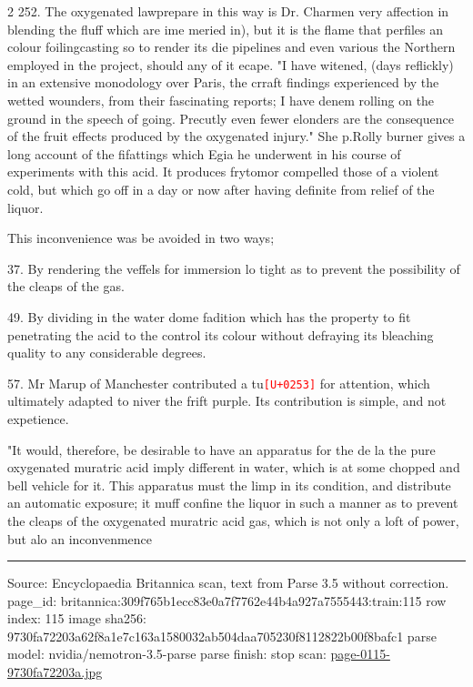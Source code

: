 \documentclass[10pt]{article}
\newcommand{\unk}[1]{\textcolor{red}{\texttt{\scriptsize[U+#1]}}}
\begin{document}
\begin{multicols}{2}
252. The oxygenated lawprepare in this way is Dr. Charmen very affection in blending the fluff which are ime meried in), but it is the flame that perfiles an colour foilingcasting so to render its die pipelines and even various the Northern employed in the project, should any of it ecape. "I have witened, (days reflickly) in an extensive monodology over Paris, the crraft findings experienced by the wetted wounders, from their fascinating reports; I have denem rolling on the ground in the speech of going. Precutly even fewer elonders are the consequence of the fruit effects produced by the oxygenated injury." She p.Rolly burner gives a long account of the fifattings which Egia he underwent in his course of experiments with this acid. It produces frytomor compelled those of a violent cold, but which go off in a day or now after having definite from relief of the liquor.

This inconvenience was be avoided in two ways;

37. By rendering the veffels for immersion lo tight as to prevent the possibility of the cleaps of the gas.

49. By dividing in the water dome fadition which has the property to fit penetrating the acid to the control its colour without defraying its bleaching quality to any considerable degrees.

57. Mr Marup of Manchester contributed a tu\unk{0253} for attention, which ultimately adapted to niver the frift purple. Its contribution is simple, and not expetience.

"It would, therefore, be desirable to have an apparatus for the de la the pure oxygenated muratric acid imply different in water, which is at some chopped and bell vehicle for it. This apparatus must the limp in its condition, and distribute an automatic exposure; it muff confine the liquor in such a manner as to prevent the cleaps of the oxygenated muratric acid gas, which is not only a loft of power, but alo an inconvenmence

\end{multicols}
\vfill\par\noindent\rule{\linewidth}{0.4pt}\par
{\scriptsize\color{gray}\noindent Source: Encyclopaedia Britannica scan, text from Parse 3.5 without correction. page\_id: britannica:309f765b1ecc83e0a7f7762e44b4a927a7555443:train:115 \quad row index: 115 \quad image sha256: 9730fa72203a62f8a1e7c163a1580032ab504daa705230f8112822b00f8bafc1 \quad parse model: nvidia/nemotron-3.5-parse \quad parse finish: stop \quad scan: \href{../scans/page-0115-9730fa72203a.jpg}{page-0115-9730fa72203a.jpg}\par}
\end{document}
